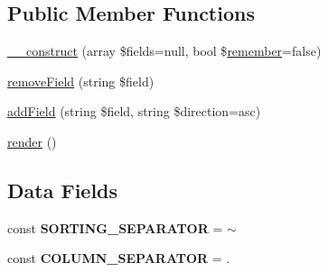 \subsection*{Public Member Functions}
\begin{DoxyCompactItemize}
\item 
\hyperlink{classhamburgscleanest_1_1_data_tables_1_1_models_1_1_data_components_1_1_sorter_a0d814929f87d0f11eeadf759faf05fcb}{\+\_\+\+\_\+construct} (array \$fields=null, bool \$\hyperlink{classhamburgscleanest_1_1_data_tables_1_1_models_1_1_data_component_a565ac6563f3548952f5b3b9807799d17}{remember}=false)
\item 
\hyperlink{classhamburgscleanest_1_1_data_tables_1_1_models_1_1_data_components_1_1_sorter_aa4c3f30fa02501d5020e400bef11a9bb}{remove\+Field} (string \$field)
\item 
\hyperlink{classhamburgscleanest_1_1_data_tables_1_1_models_1_1_data_components_1_1_sorter_aa5b9b656f19ab3777d6a2ad013c648fc}{add\+Field} (string \$field, string \$direction=\textquotesingle{}asc\textquotesingle{})
\item 
\hyperlink{classhamburgscleanest_1_1_data_tables_1_1_models_1_1_data_components_1_1_sorter_afde88292c44dc59faf017738dae6dffb}{render} ()
\end{DoxyCompactItemize}
\subsection*{Data Fields}
\begin{DoxyCompactItemize}
\item 
\mbox{\label{classhamburgscleanest_1_1_data_tables_1_1_models_1_1_data_components_1_1_sorter_a087c53f1298172fcd6792a9e6d094786}} 
const {\bfseries S\+O\+R\+T\+I\+N\+G\+\_\+\+S\+E\+P\+A\+R\+A\+T\+OR} = \textquotesingle{}$\sim$\textquotesingle{}
\item 
\mbox{\label{classhamburgscleanest_1_1_data_tables_1_1_models_1_1_data_components_1_1_sorter_a3506ba6f9fa4c5bb1fa04da91367e6bd}} 
const {\bfseries C\+O\+L\+U\+M\+N\+\_\+\+S\+E\+P\+A\+R\+A\+T\+OR} = \textquotesingle{}.\textquotesingle{}
\end{DoxyCompactItemize}

